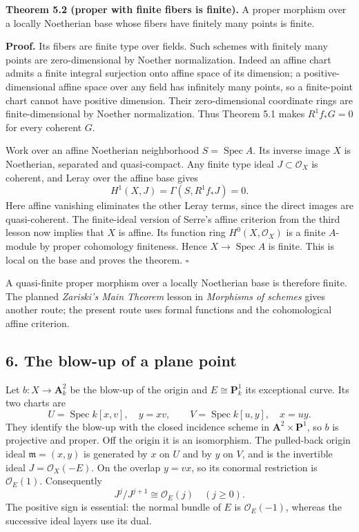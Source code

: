 \documentclass[11pt]{article}
\begin{document}
\textbf{Theorem 5.2 (proper with finite fibers is finite).} A proper
morphism over a locally Noetherian base whose fibers have finitely many
points is finite.

\textbf{Proof.} Its fibers are finite type over fields. Such schemes
with finitely many points are zero-dimensional by Noether normalization.
Indeed an affine chart admits a finite integral surjection onto affine
space of its dimension; a positive-dimensional affine space over any
field has infinitely many points, so a finite-point chart cannot have
positive dimension. Their zero-dimensional coordinate rings are
finite-dimensional by Noether normalization. Thus Theorem 5.1 makes
\(R^1f_*G=0\) for every coherent \(G\).

Work over an affine Noetherian neighborhood \(S=\operatorname{Spec}A\).
Its inverse image \(X\) is Noetherian, separated and quasi-compact. Any
finite type ideal \(J\subset\mathcal O_X\) is coherent, and Leray over
the affine base gives \[
H^1(X,J)=\Gamma(S,R^1f_*J)=0.
\] Here affine vanishing eliminates the other Leray terms, since the
direct images are quasi-coherent. The finite-ideal version of Serre's
affine criterion from the third lesson now implies that \(X\) is affine.
Its function ring \(H^0(X,\mathcal O_X)\) is a finite \(A\)-module by
proper cohomology finiteness. Hence \(X\to\operatorname{Spec}A\) is
finite. This is local on the base and proves the theorem. \(\square\)

A quasi-finite proper morphism over a locally Noetherian base is
therefore finite. The planned \emph{Zariski's Main Theorem} lesson in
\emph{Morphisms of schemes} gives another route; the present route uses
formal functions and the cohomological affine criterion.

\subsection{6. The blow-up of a plane
point}\label{the-blow-up-of-a-plane-point}

Let \(b:X\to\mathbf A^2_k\) be the blow-up of the origin and
\(E\cong\mathbf P^1_k\) its exceptional curve. Its two charts are \[
U=\operatorname{Spec}k[x,v],\quad y=xv,
\qquad V=\operatorname{Spec}k[u,y],\quad x=uy.
\] They identify the blow-up with the closed incidence scheme in
\(\mathbf A^2\times\mathbf P^1\), so \(b\) is projective and proper. Off
the origin it is an isomorphism. The pulled-back origin ideal
\(\mathfrak m=(x,y)\) is generated by \(x\) on \(U\) and by \(y\) on
\(V\), and is the invertible ideal \(J=\mathcal O_X(-E)\). On the
overlap \(y=vx\), so its conormal restriction is \(\mathcal O_E(1)\).
Consequently \[
J^j/J^{j+1}\cong\mathcal O_E(j)\quad(j\geq0).
\] The positive sign is essential: the normal bundle of \(E\) is
\(\mathcal O_E(-1)\), whereas the successive ideal layers use its dual.
\end{document}
